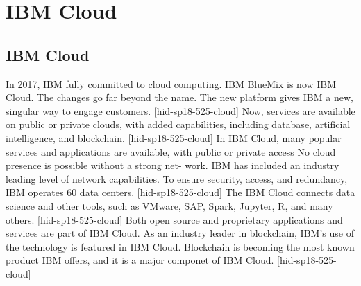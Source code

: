 \section{IBM Cloud}


\subsection{IBM Cloud}
In 2017, IBM fully committed to cloud computing. IBM BlueMix
is now IBM Cloud. The changes go far beyond the name. The new 
platform gives IBM a new, singular way to engage customers. 
[hid-sp18-525-cloud] Now, services are available on public or 
private clouds, with added capabilities, including database, 
artificial intelligence, and blockchain. [hid-sp18-525-cloud]
In IBM Cloud, many popular services and applications are 
available, with public or private access No cloud presence 
is possible without a strong net- work. IBM has included an 
industry leading level of network capabilities. To ensure 
security, access, and redundancy, IBM operates 60 data centers. 
[hid-sp18-525-cloud]
The IBM Cloud connects data science and other tools, such as 
VMware, SAP, Spark, Jupyter, R, and many others. 
[hid-sp18-525-cloud] Both open source and proprietary 
applications and services are part of IBM Cloud.
As an industry leader in blockchain, IBM’s use of the 
technology is featured in IBM Cloud. Blockchain is becoming 
the most known product IBM offers, and it is a major componet
of IBM Cloud. [hid-sp18-525-cloud]
